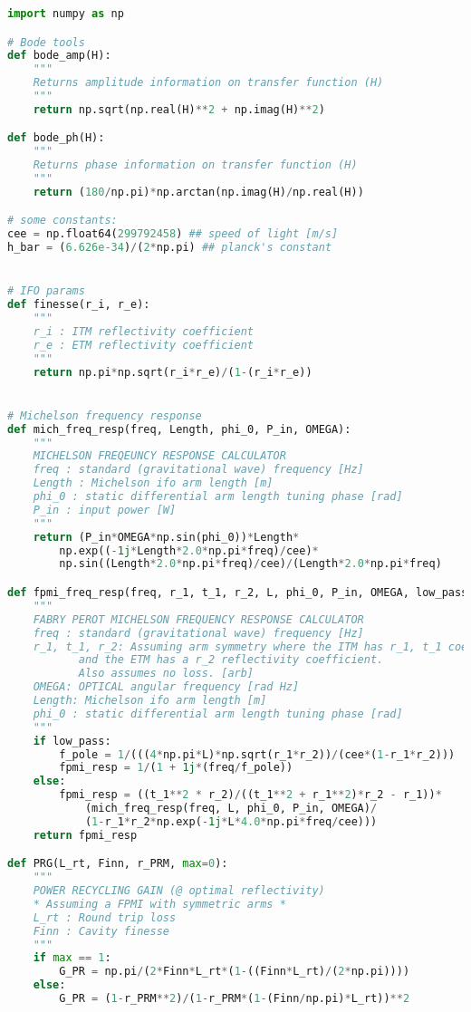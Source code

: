 \begin{lstlisting}[frame=single, language=Python]
import numpy as np

# Bode tools 
def bode_amp(H):
    """
    Returns amplitude information on transfer function (H)
    """
    return np.sqrt(np.real(H)**2 + np.imag(H)**2)

def bode_ph(H):
    """
    Returns phase information on transfer function (H)
    """
    return (180/np.pi)*np.arctan(np.imag(H)/np.real(H))

# some constants:
cee = np.float64(299792458) ## speed of light [m/s]
h_bar = (6.626e-34)/(2*np.pi) ## planck's constant


# IFO params
def finesse(r_i, r_e):
    """
    r_i : ITM reflectivity coefficient
    r_e : ETM reflectivity coefficient
    """
    return np.pi*np.sqrt(r_i*r_e)/(1-(r_i*r_e))


# Michelson frequency response
def mich_freq_resp(freq, Length, phi_0, P_in, OMEGA):
    """ 
    MICHELSON FREQEUNCY RESPONSE CALCULATOR
    freq : standard (gravitational wave) frequency [Hz]
    Length : Michelson ifo arm length [m]
    phi_0 : static differential arm length tuning phase [rad]
    P_in : input power [W] 
    """
    return (P_in*OMEGA*np.sin(phi_0))*Length*
	    np.exp((-1j*Length*2.0*np.pi*freq)/cee)*
	    np.sin((Length*2.0*np.pi*freq)/cee)/(Length*2.0*np.pi*freq)

def fpmi_freq_resp(freq, r_1, t_1, r_2, L, phi_0, P_in, OMEGA, low_pass=False):
    """
    FABRY PEROT MICHELSON FREQUENCY RESPONSE CALCULATOR
    freq : standard (gravitational wave) frequency [Hz]
    r_1, t_1, r_2: Assuming arm symmetry where the ITM has r_1, t_1 coefficients 
		   and the ETM has a r_2 reflectivity coefficient. 
		   Also assumes no loss. [arb]
    OMEGA: OPTICAL angular frequency [rad Hz]
    Length: Michelson ifo arm length [m]
    phi_0 : static differential arm length tuning phase [rad]
    """
    if low_pass:
        f_pole = 1/(((4*np.pi*L)*np.sqrt(r_1*r_2))/(cee*(1-r_1*r_2)))
        fpmi_resp = 1/(1 + 1j*(freq/f_pole))
    else:
        fpmi_resp = ((t_1**2 * r_2)/((t_1**2 + r_1**2)*r_2 - r_1))*
		    (mich_freq_resp(freq, L, phi_0, P_in, OMEGA)/
		    (1-r_1*r_2*np.exp(-1j*L*4.0*np.pi*freq/cee)))
    return fpmi_resp

def PRG(L_rt, Finn, r_PRM, max=0):
    """
    POWER RECYCLING GAIN (@ optimal reflectivity)
    * Assuming a FPMI with symmetric arms *
    L_rt : Round trip loss
    Finn : Cavity finesse
    """
    if max == 1:
        G_PR = np.pi/(2*Finn*L_rt*(1-((Finn*L_rt)/(2*np.pi))))
    else:
        G_PR = (1-r_PRM**2)/(1-r_PRM*(1-(Finn/np.pi)*L_rt))**2



\end{lstlisting}
